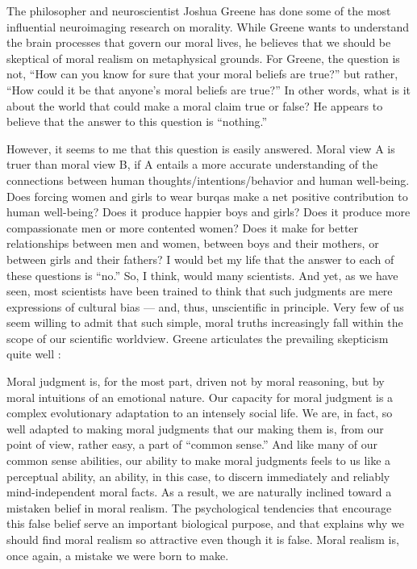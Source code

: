 \documentclass[a4paper,14pt]{extarticle}
\begin{document}
The philosopher and neuroscientist Joshua Greene has done some of the most influential neuroimaging research on morality.
While Greene wants to understand the brain processes that govern our moral lives, he believes that we should be skeptical of moral realism on metaphysical grounds.
For Greene, the question is not, ``How can you know for sure that your moral beliefs are true?'' but rather, ``How could it be that anyone's moral beliefs are true?''
In other words, what is it about the world that could make a moral claim true or false?
He appears to believe that the answer to this question is ``nothing.''

However, it seems to me that this question is easily answered.
Moral view A is truer than moral view B, if A entails a more accurate understanding of the connections between human thoughts/intentions/behavior and human well-being.
Does forcing women and girls to wear burqas make a net positive contribution to human well-being?
Does it produce happier boys and girls?
Does it produce more compassionate men or more contented women?
Does it make for better relationships between men and women, between boys and their mothers, or between girls and their fathers?
I would bet my life that the answer to each of these questions is ``no.''
So, I think, would many scientists.
And yet, as we have seen, most scientists have been trained to think that such judgments are mere expressions of cultural bias --- and, thus, unscientific in principle.
Very few of us seem willing to admit that such simple, moral truths increasingly fall within the scope of our scientific worldview.
Greene articulates the prevailing skepticism quite well :

Moral judgment is, for the most part, driven not by moral reasoning, but by moral intuitions of an emotional nature.
Our capacity for moral judgment is a complex evolutionary adaptation to an intensely social life.
We are, in fact, so well adapted to making moral judgments that our making them is, from our point of view, rather easy, a part of ``common sense.''
And like many of our common sense abilities, our ability to make moral judgments feels to us like a perceptual ability, an ability, in this case, to discern immediately and reliably mind-independent moral facts.
As a result, we are naturally inclined toward a mistaken belief in moral realism.
The psychological tendencies that encourage this false belief serve an important biological purpose, and that explains why we should find moral realism so attractive even though it is false.
Moral realism is, once again, a mistake we were born to make.
\end{document}
